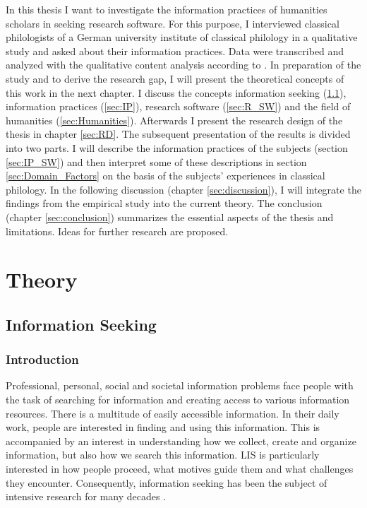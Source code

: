 \documentclass[12pt, a4paper, titlepage, oneside, abstract=true, toc=listof, toc=bibliography, BCOR=1cm]{scrreprt}
\begin{document}
In this thesis I want to investigate the information practices of humanities scholars in seeking research software. For this purpose, I interviewed classical philologists of a German university institute of classical philology in a qualitative study and asked about their information practices. Data were transcribed and analyzed with the qualitative content analysis according to \citet{Mayring2014}. In preparation of the study and to derive the research gap, I will present the theoretical concepts of this work in the next chapter. I discuss the concepts information seeking (\ref{sec:IS}), information practices (\ref{sec:IP}), research software (\ref{sec:R_SW}) and the field of humanities (\ref{sec:Humanities}). Afterwards I present the research design of the thesis in chapter \ref{sec:RD}. The subsequent presentation of the results is divided into two parts. I will describe the information practices of the subjects (section \ref{sec:IP_SW}) and then interpret some of these descriptions in section \ref{sec:Domain_Factors} on the basis of the subjects' experiences in classical philology. In the following discussion (chapter \ref{sec:discussion}), I will integrate the findings from the empirical study into the current theory. The conclusion (chapter \ref{sec:conclusion}) summarizes the essential aspects of the thesis and limitations. Ideas for further research are proposed.

\chapter{Theory}

\section{Information Seeking}
\label{sec:IS}

\subsection{Introduction}
Professional, personal, social and societal information problems face people with the task of searching for information and creating access to various information resources. There is a multitude of easily accessible information. In their daily work, people are interested in finding and using this information. This is accompanied by an interest in understanding how we collect, create and organize information, but also how we search this information. \gls{LIS} is particularly interested in how people proceed, what motives guide them and what challenges they encounter. Consequently, information seeking has been the subject of intensive research for many decades \citep[p. 55ff]{Ingwersen2005}. 
\end{document}
